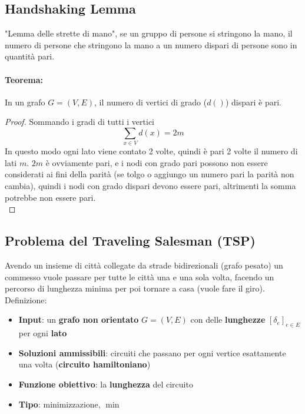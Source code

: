 \newpage

\subsection*{Handshaking Lemma}
"Lemma delle strette di mano", se un gruppo di persone si stringono la mano, il numero di persone che stringono la mano a un numero dispari di persone sono in quantità pari.\\

\paragraph{Teorema:} In un grafo $G=(V,E)$, il numero di vertici di grado ($d()$) dispari è pari.\\

\begin{proof}
	Sommando i gradi di tutti i vertici
	$$ \sum_{x \in V} d(x) = 2m $$
	In questo modo ogni lato viene contato 2 volte, quindi è pari 2 volte il numero di lati $m$. $2m$ è ovviamente pari, e i nodi con grado pari possono non essere considerati ai fini della parità (se tolgo o aggiungo un numero pari la parità non cambia), quindi i nodi con grado dispari devono essere pari, altrimenti la somma potrebbe non essere pari.\\
\end{proof}


\newpage

\subsection{Problema del Traveling Salesman (TSP)}
Avendo un insieme di città collegate da strade bidirezionali (grafo pesato) un commesso vuole passare per tutte le città una e una sola volta, facendo un percorso di lunghezza minima per poi tornare a casa (vuole fare il giro).\\

Definizione: 
\begin{itemize}
	\item \textbf{Input}: un \textbf{grafo non orientato} $G = (V,E)$ con delle \textbf{lunghezze} $[\delta_e]_{e \in E}$ per ogni \textbf{lato}
	
	\item \textbf{Soluzioni ammissibili}: circuiti che passano per ogni vertice esattamente una volta (\textbf{circuito hamiltoniano})
	
	\item \textbf{Funzione obiettivo}: la \textbf{lunghezza} del circuito
	
	\item \textbf{Tipo}: minimizzazione, $\min$
\end{itemize}


